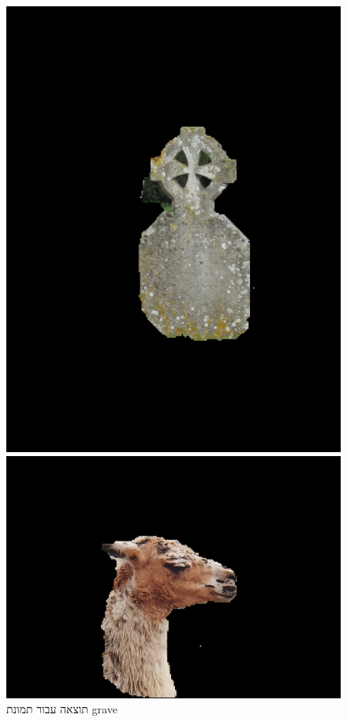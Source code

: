 \documentclass[a4paper,12pt]{article}
\begin{document}
\begin{figure}[H]
    \centering
    \begin{minipage}{0.3\textwidth}
        \centering
        \includegraphics[width=\textwidth]{my_reasults/final_img/grave_result.png}
        \caption{תוצאה עבור תמונת grave}
    \end{minipage}
    \hfill
    \begin{minipage}{0.3\textwidth}
        \centering
        \includegraphics[width=\textwidth]{my_reasults/final_img/llama_result.png}

\end{minipage}
\end{figure}
\end{document}
